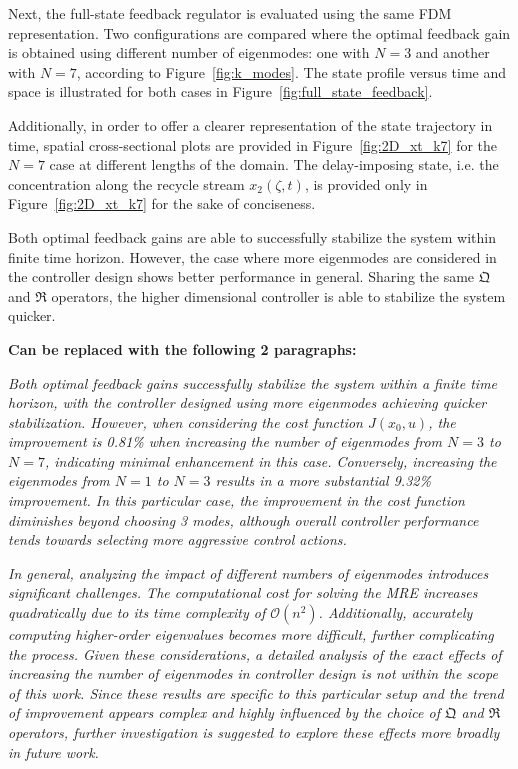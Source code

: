 Next, the full-state feedback regulator is evaluated using the same FDM representation. Two configurations are compared where the optimal feedback gain is obtained using different number of eigenmodes: one with $N=3$ and another with $N=7$, according to Figure~\ref{fig:k_modes}. The state profile versus time and space is illustrated for both cases in Figure~\ref{fig:full_state_feedback}. 

Additionally, in order to offer a clearer representation of the state trajectory in time, spatial cross-sectional plots are provided in Figure~\ref{fig:2D_xt_k7} for the $N=7$ case at different lengths of the domain. The delay-imposing state, i.e. the concentration along the recycle stream $x_2(\zeta,t)$, is provided only in Figure~\ref{fig:2D_xt_k7} for the sake of conciseness.

Both optimal feedback gains are able to successfully stabilize the system within finite time horizon. However, the case where more eigenmodes are considered in the controller design shows better performance in general. Sharing the same $\mathfrak{Q}$ and $\mathfrak{R}$ operators, the higher dimensional controller is able to stabilize the system quicker.

\textbf{Can be replaced with the following 2 paragraphs:}

\textit{Both optimal feedback gains successfully stabilize the system within a finite time horizon, with the controller designed using more eigenmodes achieving quicker stabilization. However, when considering the cost function $J(x_0,u)$, the improvement is 0.81\% when increasing the number of eigenmodes from $N = 3$ to $N = 7$, indicating minimal enhancement in this case. Conversely, increasing the eigenmodes from $N = 1$ to $N = 3$ results in a more substantial 9.32\% improvement. In this particular case, the improvement in the cost function diminishes beyond choosing 3 modes, although overall controller performance tends towards selecting more aggressive control actions.}

\textit{In general, analyzing the impact of different numbers of eigenmodes introduces significant challenges. The computational cost for solving the MRE increases quadratically due to its time complexity of $\mathcal{O}(n^2)$. Additionally, accurately computing higher-order eigenvalues becomes more difficult, further complicating the process. Given these considerations, a detailed analysis of the exact effects of increasing the number of eigenmodes in controller design is not within the scope of this work. Since these results are specific to this particular setup and the trend of improvement appears complex and highly influenced by the choice of $\mathfrak{Q}$ and $\mathfrak{R}$ operators, further investigation is suggested to explore these effects more broadly in future work.}

